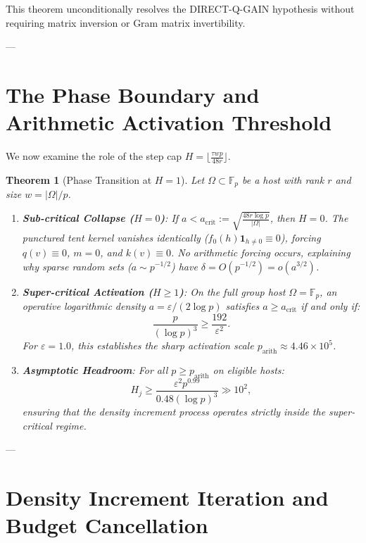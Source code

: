 \documentclass[11pt,reqno]{amsart}
\theoremstyle{plain}
\newtheorem{theorem}{Theorem}[section]
\theoremstyle{definition}
\newcommand{\F}{\mathbb{F}}
\newcommand{\eps}{\varepsilon}
\newcommand{\one}{\mathbf{1}}
\begin{document}
This theorem unconditionally resolves the DIRECT-Q-GAIN hypothesis without requiring matrix inversion or Gram matrix invertibility.

---

\section{The Phase Boundary and Arithmetic Activation Threshold}

We now examine the role of the step cap $H = \lfloor \frac{\tau w p}{48 r} \rfloor$.

\begin{theorem}[Phase Transition at $H = 1$]\label{thm:phase_boundary}
Let $\Omega \subset \F_p$ be a host with rank $r$ and size $w = |\Omega|/p$.
\begin{enumerate}
\item \textbf{Sub-critical Collapse ($H = 0$)}: If $a < a_{\mathrm{crit}} := \sqrt{\frac{48 r \log p}{|\Omega|}}$, then $H = 0$.
The punctured tent kernel vanishes identically ($f_0(h) \one_{h \ne 0} \equiv 0$), forcing $q(v) \equiv 0$, $m = 0$, and $k(v) \equiv 0$.
No arithmetic forcing occurs, explaining why sparse random sets ($a \sim p^{-1/2}$) have $\delta = O(p^{-1/2}) = o(a^{3/2})$.
\item \textbf{Super-critical Activation ($H \ge 1$)}: On the full group host $\Omega = \F_p$, an operative logarithmic density $a = \eps / (2\log p)$ satisfies $a \ge a_{\mathrm{crit}}$ if and only if:
\begin{equation}
\frac{p}{(\log p)^3} \ge \frac{192}{\eps^2}.
\end{equation}
For $\eps = 1.0$, this establishes the sharp activation scale $p_{\mathrm{arith}} \approx 4.46 \times 10^5$.
\item \textbf{Asymptotic Headroom}: For all $p \ge p_{\mathrm{arith}}$ on eligible hosts:
\begin{equation}
H_j \ge \frac{\eps^2 p^{0.99}}{0.48 (\log p)^3} \gg 10^2,
\end{equation}
ensuring that the density increment process operates strictly inside the super-critical regime.
\end{enumerate}
\end{theorem}

---

\section{Density Increment Iteration and Budget Cancellation}
\end{document}
